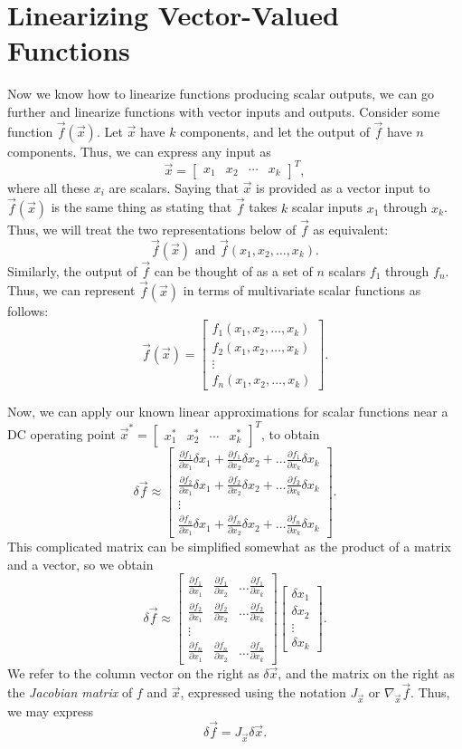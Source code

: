 \documentclass[letterpaper]{article}
\theoremstyle{remark}
\newcommand{\mat}[1]{\ensuremath{\begin{bmatrix}#1\end{bmatrix}}}
\newcommand{\p}[2]{\frac{\partial #1}{\partial #2}}
\begin{document}
\section{Linearizing Vector-Valued Functions}
Now we know how to linearize functions producing scalar outputs, we can go further and linearize functions with vector inputs and outputs. Consider some function $\vec{f}(\vec{x})$. Let $\vec{x}$ have $k$ components, and let the output of $\vec{f}$ have $n$ components. Thus, we can express any input as
\[
    \vec{x} = \mat{x_1 & x_2 & \cdots & x_k}^T,
\]
where all these $x_i$ are scalars. Saying that $\vec{x}$ is provided as a vector input to $\vec{f}(\vec{x})$ is the same thing as stating that $\vec{f}$ takes $k$ scalar inputs $x_1$ through $x_k$. Thus, we will treat the two representations below of $\vec{f}$ as equivalent:
\[
    \vec{f}(\vec{x}) \text{ and } \vec{f}(x_1, x_2, \ldots, x_k).
\]
Similarly, the output of $\vec{f}$ can be thought of as a set of $n$ scalars $f_1$ through $f_n$. Thus, we can represent $\vec{f}(\vec{x})$ in terms of multivariate scalar functions as follows:
\[
    \vec{f}(\vec{x}) = \mat{f_1(x_1, x_2, \ldots, x_k) \\ f_2(x_1, x_2, \ldots, x_k) \\ \vdots \\ f_n(x_1, x_2, \ldots, x_k)}.
\]

Now, we can apply our known linear approximations for scalar functions near a DC operating point $\vec{x}^* = \mat{x^*_1 & x^*_2 & \cdots & x^*_k}^T$, to obtain
\[
    \delta \vec{f} \approx \mat{
    \p{f_1}{x_1} \delta x_1 + \p{f_1}{x_2} \delta x_2 + \ldots \p{f_1}{x_k} \delta x_k \\
    \p{f_2}{x_1} \delta x_1 + \p{f_2}{x_2} \delta x_2 + \ldots \p{f_2}{x_k} \delta x_k \\
    \vdots \\
    \p{f_n}{x_1} \delta x_1 + \p{f_n}{x_2} \delta x_2 + \ldots \p{f_n}{x_k} \delta x_k}.
\]
This complicated matrix can be simplified somewhat as the product of a matrix and a vector, so we obtain
\[
    \delta \vec{f} \approx \mat{
    \p{f_1}{x_1} & \p{f_1}{x_2} & \ldots \p{f_1}{x_k} \\
    \p{f_2}{x_1} & \p{f_2}{x_2} & \ldots \p{f_2}{x_k} \\
    \vdots \\
    \p{f_n}{x_1} & \p{f_n}{x_2} & \ldots \p{f_n}{x_k}} \mat{\delta x_1 \\ \delta x_2 \\ \vdots \\ \delta x_k}.
\]
We refer to the column vector on the right as $\delta \vec{x}$, and the matrix on the right as the \emph{Jacobian matrix} of $f$ and $\vec{x}$, expressed using the notation $J_{\vec{x}}$ or $\nabla_{\vec{x}}\vec{f}$. Thus, we may express
\[
    \delta \vec{f} = J_{\vec{x}}\delta\vec{x}.
\]
\end{document}
